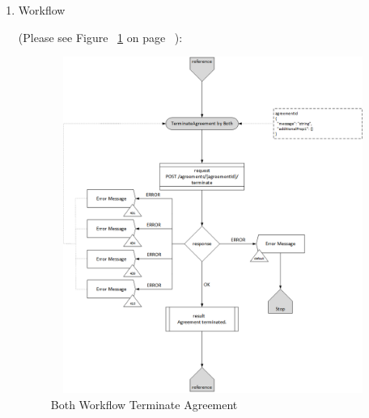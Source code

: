 \begin{enumerate}
\item Workflow

(Please see Figure ~\ref{fig:BTA} on page ~\pageref{fig:BTA}):

\begin{figure}[htbp]
    \centering
    \includegraphics[width=11cm,height=11cm,angle=0]{./diag/Workflow/Market/TerminateAgreement-B-Workflow.png}
    \caption{Both Workflow Terminate Agreement  }
	\label{fig:BTA}
\end{figure}

\end{enumerate}

\newpage


